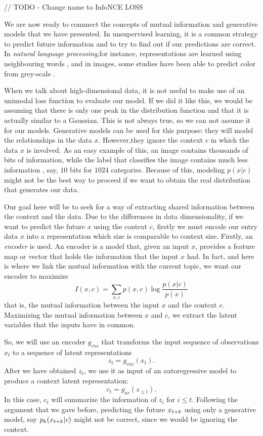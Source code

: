 // TODO - Change name to InfoNCE LOSS

We are now ready to connnect the concepts of mutual information and generative models that we have presented. In unsupervised learning,
it is a common strategy to predict future information and to try to find out if our predictions are correct.
In \emph{natural language processing},for instance, representations are learned 
using neighbouring words \citep{mikolov_efficient_2013}, and in images, some studies have been able to predict color from grey-scale \citep{doersch_unsupervised_2016}.

When we talk about high-dimensional data, it is not useful to make use of an unimodal loss function to evaluate our model. If we did it like this, we would be assuming that there is only
one peak in the distribution function and that it is actually similar to a Gaussian.  This is not always true, so we can not assume it for our models. Generative models can be used for this purpose:
they will model the relationships in the data $x$. However,they ignore the context $c$ in which the data $x$ is involved. As an easy example of this, an image contains thousands of bits of information,
while the label that classifies the image contains much less information , say, $10$ bits for $1024$ categories. Because of this, modeling $p(x|c)$ might not be the best way to proceed if we want
to obtain the real distribution that generates our data. 

Our goal here will be to seek for a way of extracting shared information between the context and the data. Due to the differences in data dimensionality, if we want to predict the future $x$ using the context $c$, firstly we must
encode our entry data $x$ into a representation which size is comparable to context size. Firstly, an \emph{encoder} is used. An encoder is a model that, given an input $x$, provides a feature map or vector that holds the information
that the input $x$ had. In fact, and here is where we link the mutual information with the current topic, we want our encoder to maximize
\begin{equation}\label{EQ:MI}
I(x,c) = \sum_{x,c}p(x,c)\log\frac{p(x|c)}{p(x)}
\end{equation}
that is, the mutual information between the input $x$ and the context $c$.  Maximizing the mutual information between $x$ and $c$, we extract the latent variables
that the inputs have in common.

So, we will use an encoder $g_{enc}$ that transforms the input sequence of observations $x_t$ to a sequence of latent representations
$$
z_t = g_{enc}(x_t).
$$
After we have obtained $z_t$, we use it as input of an autoregressive model to produce a context latent representation:
$$
c_t = g_{ar}(z_{\leq t}).
$$
In this case, $c_t$ will summarize the information of $z_i$ for $i \leq t$. Following the argument that we gave before, predicting the future $x_{t+k}$ using only a generative model, say $p_k(x_{t+k}|c)$
might not be correct, since we would be ignoring the context. \\

